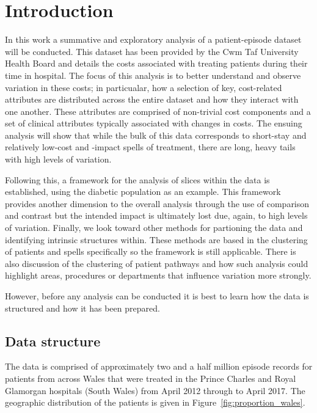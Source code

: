 \section{Introduction}\label{sec:intro}

In this work a summative and exploratory analysis of a patient-episode dataset
will be conducted. This dataset has been provided by the Cwm Taf University
Health Board and details the costs associated with treating patients during
their time in hospital. The focus of this analysis is to better understand and
observe variation in these costs; in particualar, how a selection of key,
cost-related attributes are distributed across the entire dataset and how
they interact with one another. These attributes are comprised of non-trivial
cost components and a set of clinical attributes typically associated with
changes in costs. The ensuing analysis will show that while the bulk of this data
corresponds to short-stay and relatively low-cost and -impact spells of
treatment, there are long, heavy tails with high levels of variation.
        
Following this, a framework for the analysis of slices within the data is
established, using the diabetic population as an example. This framework
provides another dimension to the overall analysis through the use of comparison
and contrast but the intended impact is ultimately lost due, again, to high
levels of variation. Finally, we look toward other methods
for partioning the data and identifying intrinsic structures within. These
methods are based in the clustering of patients and spells specifically so the
framework is still applicable. There is also discussion of the clustering of
patient pathways and how such analysis could highlight areas, procedures or
departments that influence variation more strongly.

However, before any analysis can be conducted it is best to learn how the data
is structured and how it has been prepared.

\subsection{Data structure}\label{subsec:structure}

The data is comprised of approximately two and a half million episode
records for patients from across Wales that were treated in the Prince
Charles and Royal Glamorgan hospitals (South Wales) from April 2012 through to
April 2017. The geographic distribution of the patients is given in
Figure~\ref{fig:proportion_wales}.

